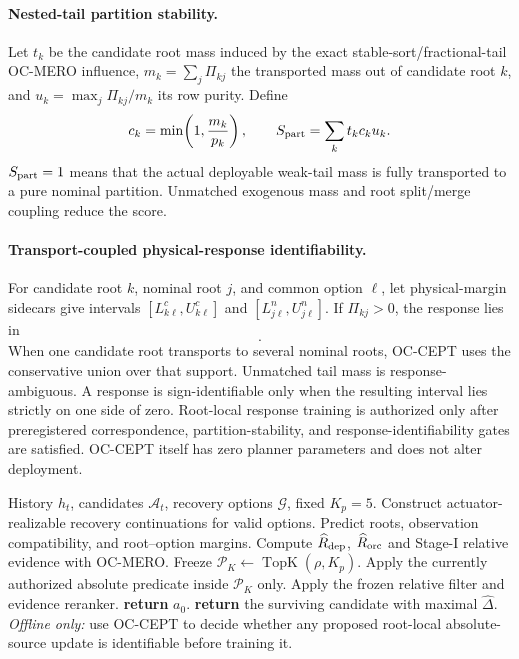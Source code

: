 \documentclass[conference]{IEEEtran}
\DeclareMathOperator{\TopK}{TopK}
\begin{document}
\paragraph{Nested-tail partition stability.}
Let $t_k$ be the candidate root mass induced by the exact stable-sort/fractional-tail OC-MERO influence, $m_k=\sum_j\Pi_{kj}$ the transported mass out of candidate root $k$, and $u_k=\max_j\Pi_{kj}/m_k$ its row purity. Define
\begin{equation}
 c_k=\min\!\left(1,\frac{m_k}{p_k}\right),\qquad
 S_{\rm part}=\sum_k t_k c_k u_k.
 \label{eq:partition_stability}
\end{equation}
$S_{\rm part}=1$ means that the actual deployable weak-tail mass is fully transported to a pure nominal partition. Unmatched exogenous mass and root split/merge coupling reduce the score.

\paragraph{Transport-coupled physical-response identifiability.}
For candidate root $k$, nominal root $j$, and common option $\ell$, let physical-margin sidecars give intervals $[L^c_{k\ell},U^c_{k\ell}]$ and $[L^n_{j\ell},U^n_{j\ell}]$. If $\Pi_{kj}>0$, the response lies in
\begin{equation}
 [L^c_{k\ell}-U^n_{j\ell},\;U^c_{k\ell}-L^n_{j\ell}].
\end{equation}
When one candidate root transports to several nominal roots, OC-CEPT uses the conservative union over that support. Unmatched tail mass is response-ambiguous. A response is sign-identifiable only when the resulting interval lies strictly on one side of zero. Root-local response training is authorized only after preregistered correspondence, partition-stability, and response-identifiability gates are satisfied. OC-CEPT itself has zero planner parameters and does not alter deployment.

\begin{algorithm}[t]
\caption{OC-RAP with Identifiability-Gated Role-Isolated Admission}
\label{alg:ocrap_rifa}
\begin{algorithmic}[1]
\REQUIRE History $h_t$, candidates $\mathcal{A}_t$, recovery options $\mathcal{G}$, fixed $K_p=5$.
    \STATE Construct actuator-realizable recovery continuations for valid options.
    \STATE Predict roots, observation compatibility, and root--option margins.
    \STATE Compute $\widehat R_{\rm dep}$, $\widehat R_{\rm orc}$ and Stage-I relative evidence with OC-MERO.
\ENDFOR
\STATE Freeze $\mathcal{P}_K\leftarrow\TopK(\rho,K_p)$.
\STATE Apply the currently authorized absolute predicate inside $\mathcal{P}_K$ only.
\STATE Apply the frozen relative filter and evidence reranker.
    \STATE \textbf{return} $a_0$.
\ELSE
    \STATE \textbf{return} the surviving candidate with maximal $\widehat\Delta$.
\ENDIF
\STATE \textit{Offline only:} use OC-CEPT to decide whether any proposed root-local absolute-source update is identifiable before training it.
\end{algorithmic}
\end{algorithm}
\end{document}
